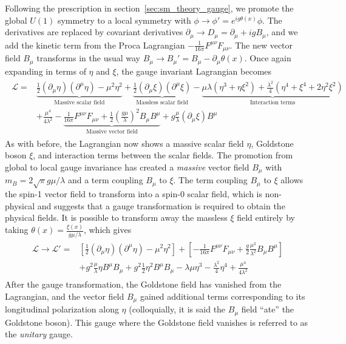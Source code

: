Following the prescription in section~\ref{sec:sm_theory_gauge}, we promote the global $U(1)$ symmetry to a local symmetry with $\phi\to\phi'=e^{ig\theta(x)}\phi$. The derivatives are replaced by covariant derivatives $\partial_\mu\to D_\mu=\partial_\mu+igB_\mu$, and we add the kinetic term from the Proca Lagrangian $-\frac{1}{16\pi}F^{\mu\nu}F_{\mu\nu}$. The new vector field $B_\mu$ transforms in the usual way $B_\mu\to B_\mu'=B_\mu-\partial_\mu\theta(x)$. Once again expanding in terms of $\eta$ and $\xi$, the gauge invariant Lagrangian becomes
\begin{align}
	\begin{split}
		\mathcal{L}=&\underbrace{\frac{1}{2}(\partial_\mu\eta)(\partial^\mu\eta)-\mu^2\eta^2}_\text{Massive scalar field}+\underbrace{\frac{1}{2}(\partial_\mu\xi)(\partial^\mu\xi)}_\text{Massless scalar field}-\underbrace{\mu\lambda(\eta^3+\eta\xi^2)+\frac{\lambda^2}{4}(\eta^4+\xi^4+2\eta^2\xi^2)}_\text{Interaction terms}\\
		&+\frac{\mu^4}{4\lambda^2}-\underbrace{\frac{1}{16\pi}F^{\mu\nu}F_{\mu\nu}+\frac{1}{2}\left(\frac{g\mu}{\lambda}\right)^2B_\mu B^\mu}_\text{Massive vector field}+g\frac{\mu}{\lambda}(\partial_\mu\xi)B^\mu
	\end{split}
\end{align}
As with before, the Lagrangian now shows a massive scalar field $\eta$, Goldstone boson $\xi$, and interaction terms between the scalar fields. The promotion from global to local gauge invariance has created a \textit{massive} vector field $B_\mu$ with $m_B=2\sqrt{\pi}g\mu/\lambda$ and a term coupling $B_\mu$ to $\xi$. The term coupling $B_\mu$ to $\xi$ allows the spin-1 vector field to transform into a spin-0 scalar field, which is non-physical and suggests that a gauge transformation is required to obtain the physical fields. It is possible to transform away the massless $\xi$ field entirely by taking $\theta(x)=\frac{\xi(x)}{g\mu/\lambda}$, which gives
\begin{align}
	\begin{split}
		\mathcal{L}\to\mathcal{L'}=&\left[\frac{1}{2}(\partial_\mu\eta)(\partial^\mu\eta)-\mu^2\eta^2\right]+\left[-\frac{1}{16\pi}F^{\mu\nu}F_{\mu\nu}+\frac{g}{2}\frac{\mu^2}{\lambda^2}B_\mu B^\mu\right]\\
		&+g^2\frac{\mu}{\lambda}\eta B^\mu B_\mu+g^2\frac{1}{2}\eta^2B^\mu B_\mu-\lambda\mu\eta^3-\frac{\lambda^2}{4}\eta^4+\frac{\mu^4}{4\lambda^2}
	\end{split}
\end{align}
After the gauge transformation, the Goldstone field has vanished from the Lagrangian, and the vector field $B_\mu$ gained additional terms corresponding to its longitudinal polarization along $\eta$ (colloquially, it is said the $B_\mu$ field ``ate'' the Goldstone boson). This gauge where the Goldstone field vanishes is referred to as the \textit{unitary} gauge.

